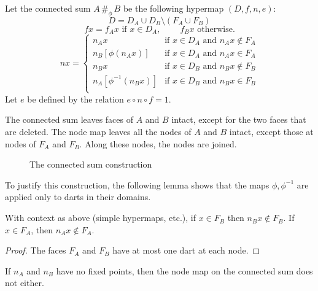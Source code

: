 \begin{definition} Let the connected sum
$A\,\#_\phi\, B$ be the following hypermap
$(D,f,n,e)$:
    $$D = D_A \cup D_B \setminus (F_A\cup F_B)$$
    $$f x = f_A x \text{\ if }  x\in D_A,\qquad \ f_B x
    \text{\ \ otherwise}.
    $$
    $$n x = \begin{cases}
    n_A x &
        \text{if }  x\in D_A \text{ and } n_A x\not\in F_A\\
    n_B[\phi(n_A x)] &
        \text{if }  x\in D_A \text{ and } n_A x\in F_A\\
    n_B x &
        \text{if }  x\in D_B \text{ and } n_B x\not\in F_B\\
    n_A[\phi^{-1}(n_B  x)] &
        \text{if }  x\in D_B \text{ and } n_B x\in F_B\\
    \end{cases}
    $$
Let $e$ be defined by the relation $e\circ n\circ f = 1$.
\end{definition}

The connected sum leaves faces of $A$ and $B$ intact,
except for the two faces that are deleted.  The node map
leaves all the nodes of $A$ and $B$ intact, except those
at nodes of $F_A$ and $F_B$.  Along these nodes, the nodes
are joined.



\begin{figure}[htb]
  \centering
  \caption{The connected sum construction}
  \label{fig:connected-sum}
\end{figure}


To justify this construction, the following lemma shows that the
maps $\phi,\phi^{-1}$ are applied only to darts in their domains.

\begin{lemma}
With context as above (simple hypermaps, etc.),
if $x\in F_B$ then $n_B x\not\in F_B$.  If $x\in
F_A$, then $n_A x\not\in F_A$.
\end{lemma}

\begin{proof} The faces $F_A$ and $F_B$ have at most one
dart at each node.
\end{proof}

\begin{lemma}
If $n_A$ and $n_B$ have no fixed points, then
    the node map on the connected sum does not either.
\end{lemma}

